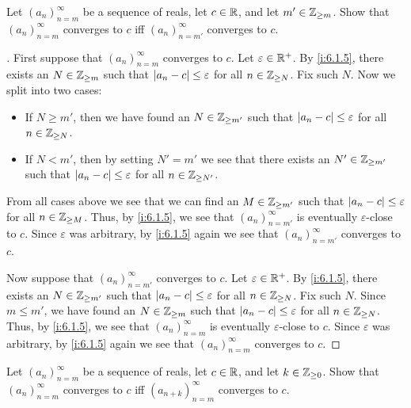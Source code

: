 \begin{ex}\label{i:ex:6.1.3}
  Let \((a_n)_{n = m}^\infty\) be a sequence of reals, let \(c \in \mathbb{R}\), and let \(m' \in \mathbb{Z}_{\geq m}\).
  Show that \((a_n)_{n = m}^\infty\) converges to \(c\) iff \((a_n)_{n = m'}^\infty\) converges to \(c\).
\end{ex}

\begin{proof}[]
  First suppose that \((a_n)_{n = m}^\infty\) converges to \(c\).
  Let \(\varepsilon \in \mathbb{R}^+\).
  By \cref{i:6.1.5}, there exists an \(N \in \mathbb{Z}_{\geq m}\) such that \(\left\lvert a_n - c\right\rvert \leq \varepsilon\) for all \(n \in \mathbb{Z}_{\geq N}\).
  Fix such \(N\).
  Now we split into two cases:
  \begin{itemize}
    \item If \(N \geq m'\), then we have found an \(N \in \mathbb{Z}_{\geq m'}\) such that \(\left\lvert a_n - c\right\rvert \leq \varepsilon\) for all \(n \in \mathbb{Z}_{\geq N}\).
    \item If \(N < m'\), then by setting \(N' = m'\) we see that there exists an \(N' \in \mathbb{Z}_{\geq m'}\) such that \(\left\lvert a_n - c\right\rvert \leq \varepsilon\) for all \(n \in \mathbb{Z}_{\geq N'}\).
  \end{itemize}
  From all cases above we see that we can find an \(M \in \mathbb{Z}_{\geq m'}\) such that \(\left\lvert a_n - c\right\rvert \leq \varepsilon\) for all \(n \in \mathbb{Z}_{\geq M}\).
  Thus, by \cref{i:6.1.5}, we see that \((a_n)_{n = m'}^\infty\) is eventually \(\varepsilon\)-close to \(c\).
  Since \(\varepsilon\) was arbitrary, by \cref{i:6.1.5} again we see that \((a_n)_{n = m'}^\infty\) converges to \(c\).

  Now suppose that \((a_n)_{n = m'}^\infty\) converges to \(c\).
  Let \(\varepsilon \in \mathbb{R}^+\).
  By \cref{i:6.1.5}, there exists an \(N \in \mathbb{Z}_{\geq m'}\) such that \(\left\lvert a_n - c\right\rvert \leq \varepsilon\) for all \(n \in \mathbb{Z}_{\geq N}\).
  Fix such \(N\).
  Since \(m \leq m'\), we have found an \(N \in \mathbb{Z}_{\geq m}\) such that \(\left\lvert a_n - c\right\rvert \leq \varepsilon\) for all \(n \in \mathbb{Z}_{\geq N}\).
  Thus, by \cref{i:6.1.5}, we see that \((a_n)_{n = m}^\infty\) is eventually \(\varepsilon\)-close to \(c\).
  Since \(\varepsilon\) was arbitrary, by \cref{i:6.1.5} again we see that \((a_n)_{n = m}^\infty\) converges to \(c\).
\end{proof}

\begin{ex}\label{i:ex:6.1.4}
  Let \((a_n)_{n = m}^\infty\) be a sequence of reals, let \(c \in \mathbb{R}\), and let \(k \in \mathbb{Z}_{\geq 0}\).
  Show that \((a_n)_{n = m}^\infty\) converges to \(c\) iff \((a_{n + k})_{n = m}^\infty\) converges to \(c\).
\end{ex}

